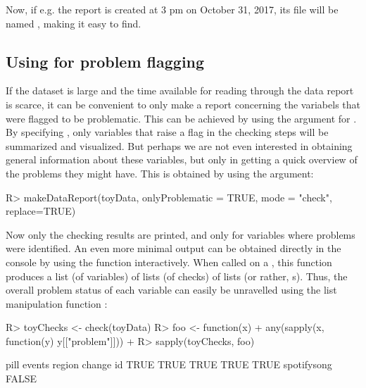 \documentclass[article,shortnames]{jss}
\begin{document}
Now, if e.g. the report is created at 3 pm on October 31, 2017, its file will be named , making it easy to find. 


\subsection[Using dataMaid for problem flagging]{Using  for problem flagging}
If the dataset is large and the time available for reading through the data report is scarce, it can be convenient to only make a report concerning the variabels that were flagged to be problematic. This can be achieved by using the  argument for
. By specifying , only
variables that raise a flag in the checking steps will be summarized
and visualized. But perhaps we are not even interested in obtaining
general information about these variables, but only in getting a quick
overview of the problems they might have. This is obtained by
using the  argument:


\begin{Schunk}
\begin{Sinput}
R> makeDataReport(toyData, onlyProblematic = TRUE, mode = "check", replace=TRUE)
\end{Sinput}
\end{Schunk}

Now only the checking results are printed, and only for variables
where problems were identified. An even more minimal output  can be obtained directly in the console by using the  function interactively. When called on a , this function produces a list (of
variables) of lists (of checks) of lists (or rather,
s). Thus, the overall problem status of each variable
can easily be unravelled using the list manipulation function
:

\begin{Schunk}
\begin{Sinput}
R> toyChecks <- check(toyData)
R> foo <- function(x) {
+    any(sapply(x, function(y) y[["problem"]]))
+  }
R> sapply(toyChecks, foo)
\end{Sinput}
\begin{Soutput}
       pill      events      region      change          id 
       TRUE        TRUE        TRUE        TRUE        TRUE 
spotifysong 
      FALSE 
\end{Soutput}
\end{Schunk}
\end{document}
